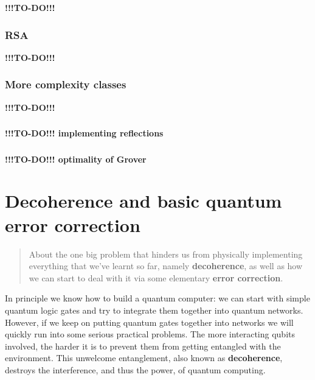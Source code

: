 \documentclass[fleqn]{article}
\let\oldsection\section
\renewcommand\section{\clearpage\oldsection}
\begin{document}
\textbf{!!!TO-DO!!!}

\hypertarget{rsa}{%
\subsubsection{RSA}\label{rsa}}

\textbf{!!!TO-DO!!!}

\hypertarget{more-complexity-classes}{%
\subsubsection{More complexity classes}\label{more-complexity-classes}}

\textbf{!!!TO-DO!!!}

\hypertarget{section-43}{%
\subsubsection{}\label{section-43}}

\textbf{!!!TO-DO!!! implementing reflections}

\hypertarget{section-44}{%
\subsubsection{}\label{section-44}}

\textbf{!!!TO-DO!!! optimality of Grover}

\hypertarget{chapter11}{%
\section{Decoherence and basic quantum error correction}\label{chapter11}}

\begin{quote}
About the one big problem that hinders us from physically implementing everything that we've learnt so far, namely \textbf{decoherence}, as well as how we can start to deal with it via some elementary \textbf{error correction}.
\end{quote}

In principle we know how to build a quantum computer: we can start with simple quantum logic gates and try to integrate them together into quantum networks.
However, if we keep on putting quantum gates together into networks we will quickly run into some serious practical problems.
The more interacting qubits involved, the harder it is to prevent them from getting entangled with the environment.
This unwelcome entanglement, also known as \textbf{decoherence}, destroys the interference, and thus the power, of quantum computing.
\end{document}
